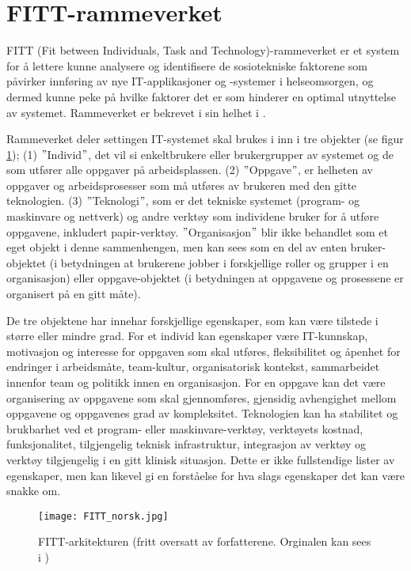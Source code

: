 \section{FITT-rammeverket}
\label{sec:fitt-remmeverket}

FITT (Fit between Individuals, Task and Technology)-rammeverket er et system for å lettere kunne analysere og identifisere de sosiotekniske faktorene som påvirker innføring av nye IT-applikasjoner og -systemer i helseomsorgen, og dermed kunne peke på hvilke faktorer det er som hinderer en optimal utnyttelse av systemet. Rammeverket er bekrevet i sin helhet i \citep{FITT}.

\noindent
Rammeverket deler settingen IT-systemet skal brukes i inn i tre objekter (se figur \ref{FITT-arkitekturen}); (1) $"$Individ$"$, det vil si enkeltbrukere eller brukergrupper av systemet og de som utfører alle oppgaver på arbeidsplassen. (2) $"$Oppgave$"$, er helheten av oppgaver og arbeidsprosesser som må utføres av brukeren med den gitte teknologien. (3) $"$Teknologi$"$, som er det tekniske systemet (program- og maskinvare og nettverk) og andre verktøy som individene bruker for å utføre oppgavene, inkludert papir-verktøy.
$"$Organisasjon$"$ blir ikke behandlet som et eget objekt i denne sammenhengen, men kan sees som en del av enten bruker-objektet (i betydningen at brukerene jobber i forskjellige roller og grupper i en organisasjon) eller oppgave-objektet (i betydningen at oppgavene og prosessene er organisert på en gitt måte).

\noindent
De tre objektene har innehar forskjellige egenskaper, som kan være tilstede i større eller mindre grad. For et individ kan egenskaper være IT-kunnskap, motivasjon og interesse for oppgaven som skal utføres, fleksibilitet og åpenhet for endringer i arbeidsmåte, team-kultur, organisatorisk kontekst, sammarbeidet innenfor team og politikk innen en organisasjon. For en oppgave kan det være organisering av oppgavene som skal gjennomføres, gjensidig avhengighet mellom oppgavene og oppgavenes grad av kompleksitet. Teknologien kan ha stabilitet og brukbarhet ved et program- eller maskinvare-verktøy, verktøyets kostnad, funksjonalitet, tilgjengelig teknisk infrastruktur, integrasjon av verktøy og verktøy tilgjengelig i en gitt klinisk situasjon. Dette er ikke fullstendige lister av egenskaper, men kan likevel gi en forståelse for hva slags egenskaper det kan være snakke om.

\begin{figure}[H]
\centering
\texttt{[image: FITT\_norsk.jpg]}
\caption{FITT-arkitekturen (fritt oversatt av forfatterene. Orginalen kan sees i \citep{FITT})}
\label{FITT-arkitekturen}
\end{figure}

